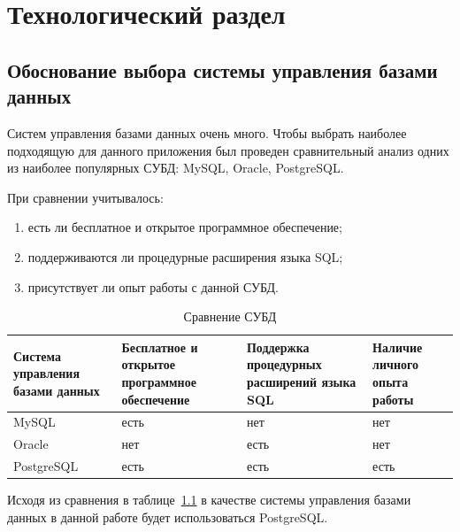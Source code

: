 \chapter{Технологический раздел}

\section{Обоснование выбора системы управления базами\\ данных}

Систем управления базами данных очень много. Чтобы выбрать наиболее подходящую для данного приложения был проведен сравнительный анализ одних из наиболее популярных СУБД: MySQL, Oracle, PostgreSQL. 

При сравнении учитывалось:
\begin{enumerate}[label*=---]
	\item есть ли бесплатное и открытое программное обеспечение;
	\item поддерживаются ли процедурные расширения языка SQL;
	\item присутствует ли опыт работы с данной СУБД.
\end{enumerate}

\begin{table}[hbtp]
	\begin{center}
		\begin{flushleft}
			\captionsetup{justification=raggedright, singlelinecheck=false}
			\caption{\label{tab:bd}Сравнение СУБД}
		\end{flushleft}
		\begin{tabular}{|  p{} | p{} | p{}  |  p{}|} 
			\hline  Система управления базами данных & Бесплатное и открытое программное обеспечение & Поддержка процедурных расширений языка SQL  &  Наличие личного опыта работы \\ \hline
			MySQL~\cite{mysql} &  есть &  нет & нет \\ \hline
                Oracle~\cite{oracleReal} &   нет  &   есть & нет  \\ \hline
                PostgreSQL~\cite{postgres} &     есть & есть & есть \\ \hline
		\end{tabular}
	\end{center}
\end{table}

Исходя из сравнения в таблице~\ref{tab:bd} в качестве системы управления базами данных в данной работе будет использоваться PostgreSQL.

